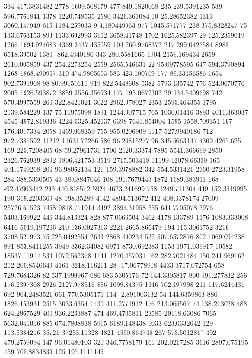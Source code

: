 334	417.3831482
2778	1609.508179
477	849.1820068
235	239.5391235
539	596.7761841
1378	1220.748535
2580	3426.361084
10	25.28652382
1313	3060.147949
615	1184.259033
9	4.180449963
977	1045.571777
238	375.8328247
75	133.6763153
893	1133.692993
3162	3658.41748
1702	1625.582397
29	125.2359619
1266	1694.924683
4369	3437.435059
104	260.9768372
217	299.0423584
8988	6518.39502
1380	-862.4940186
343	280.5581665
1904	2159.169434
2659	2610.005859
437	254.2273254
2559	2565.546631
22	95.09778595
647	594.3790894
1268	1968.490967
310	474.9805603
583	423.100769
177	89.33156586
1654	902.7391968
98	80.99151611
919	822.5448608
5382	5793.135742
776	524.0670776
2005	1926.593872
3859	3556.356934
177	195.0672302
29	134.5409698
742	570.4997559
266	322.8421021
3022	2962.978027
2353	2595.464355
1795	2139.584229
137	75.11975098
1891	1244.907715
765	1030.01416
3893	4011.363037
4545	4972.819336
4224	5325.452637
6398	7641.854004
1595	1558.709351
167	176.4017334
2058	1469.068359
755	955.0206909
1117	527.9940186
712	972.7381592
11212	11631.72266
586	96.20815277
96	345.5663147
4309	4267.625
169	225.7208405
68	59.27961731
1706	2120.33374
7895	5541.366699
2850	2326.762939
2892	1806.421753
3519	2715.503418
11199	12078.66309
165	401.1749268
206	96.98062134
121	159.3978882
342	554.5331421
2360	2723.31958
284	388.5330505
43	38.08847046
108	191.7679443
1872	1689.383911
168	-92.47903442
293	440.818512
5924	4623.241699
758	1249.711304
449	152.3619995
190	319.2203369
48	198.35289
4142	4894.513672
412	408.6378174
27009	25726.61523
7458	9818.711914
3492	3894.31958
555	641.7705078
3976	5403.169922
446	344.813324
828	877.0666504
3462	4178.133789
1176	1083.333008
6416	5019.197266
210	136.0027313
2221	2665.865479
194	115.3061752
3216	3708.521973
75	225.0492554
2633	2868.490234
532	507.6572876
802	1069.094238
891	853.8411255
3949	3362.34082
6971	8730.692383
1153	1971.039917
10582	18537.11914
534	1072.562378
1141	1270.457031
162	282.7021484
150	241.969162
212	200.8540649
4161	3218.116211
28	-17.06778908
4433	3717.072754
658	729.7684326
82	537.1990967
686	683.5305176
72	144.3305817
800	991.277832
256	176.2397308
2926	2127.978516
856	1099.84375
1346	702.197998
211	117.6244431
692	964.2483521
661	770.5305176
114	-2.891003132
54	144.6359863
886	1826.153931
2515	3033.0354
1430	411.2771912
176	213.065567
74	138.213028
488	624.2967529
400	936.2233887
474	469.4705811
23585	20118.63086
7065	5632.041016
885	674.7808838
5915	6189.148438
1033	623.0332642
129	113.5384216
35721	37253.11328
4821	4590.864746
267	578.5012817
492	479.2759094
147	96.01480103
320	346.7758179
161	202.0217285
3616	2897.075195
459	708.8834839
125	197.1111145
